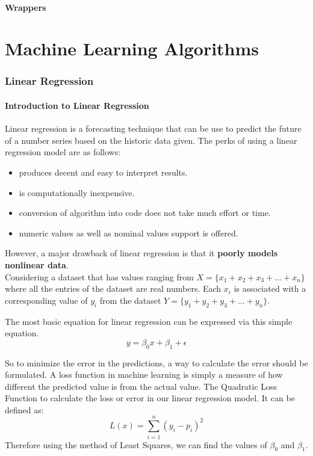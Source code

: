 \documentclass[12pt]{article}
\begin{document}
\subsection{Wrappers}
\newpage
\part{Machine Learning Algorithms}
\newpage
\section{Linear Regression}
\subsection{Introduction to Linear Regression}
Linear regression is a forecasting technique that can be use to predict the future of a number series based on the historic data given. The perks of using a linear regression model are as follows:

\begin{itemize}
  \item produces decent and  easy to interpret results.
  \item is computationally inexpensive.
  \item conversion of algorithm into code does not take much effort or time.
  \item numeric values as well as nominal values support is offered.
\end{itemize}

However, a major drawback of linear regression is that it \textbf{poorly models nonlinear data}.
\\
Considering a dataset that has values ranging from 
$X = \lbrace x_{1}+x_{2}+x_{3}+...+x_{n} \rbrace$ where
all the entries of the dataset are real numbers. Each $x_{i}$ is associated with a corresponding value of $y_{i}$ from the dataset $Y = \lbrace y_{1}+y_{2}+y_{3}+...+y_{n} \rbrace$.

The most basic equation for linear regression can be expressed via this simple equation.
$$y = \beta_{0}x+\beta_{1}+\epsilon$$

So to minimize the error in the predictions, a way to calculate the error should be formulated. A loss function in machine learning is simply a measure of how different the predicted value is from the actual value. The Quadratic Loss Function to calculate the loss or error in our linear regression model. It can be defined as:
$$L(x) = \sum_{i=1}^{n}(y_{i}-p_{i})^{2} $$
Therefore using the method of Least Squares, we can find the values of $\beta_{0}$ and $\beta_{1}$.
\end{document}

